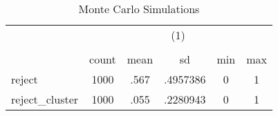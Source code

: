 \begin{table}[htbp]\centering
\def\sym#1{\ifmmode^{#1}\else\(^{#1}\)\fi}
\caption{Monte Carlo Simulations}
\begin{tabular}{l*{1}{ccccc}}
\hline\hline
            &\multicolumn{5}{c}{(1)}                                         \\
            &\multicolumn{5}{c}{}                                            \\
            &       count&        mean&          sd&         min&         max\\
\hline
reject      &        1000&        .567&    .4957386&           0&           1\\
reject\_cluster&        1000&        .055&    .2280943&           0&           1\\
\hline\hline
\end{tabular}
\end{table}
